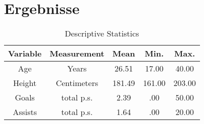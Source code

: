 \chapter{Ergebnisse}

\lipsum[16]

\begin{table}[h]
\centering
    \begin{tabular}{c c c c c}
        \toprule
        \textbf{Variable} & \textbf{Measurement} & \textbf{Mean} & \textbf{Min.} & \textbf{Max.} \\ 
        \toprule
        Age     & Years         & 26.51     & 17.00     & 40.00     \\
        Height  & Centimeters   & 181.49    & 161.00    & 203.00    \\
        Goals   & total p.s.    & 2.39      & .00       & 50.00     \\
        Assists & total p.s.    & 1.64      & .00       & 20.00     \\
        \bottomrule
    \end{tabular}
\caption[Descriptive Statistics]{Descriptive Statistics \citep{muller2017beyond}}
\label{table:descriptive_statistics}
\end{table}

\lipsum[17-20]